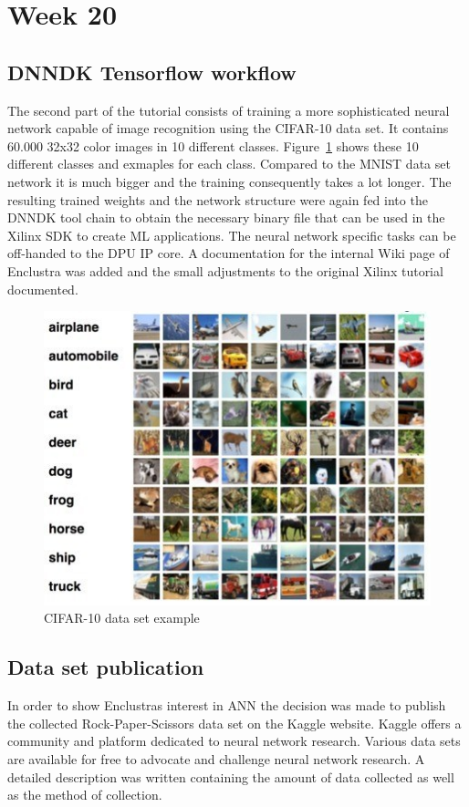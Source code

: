 \section{Week 20}
\subsection{\acs{DNNDK} Tensorflow workflow}
The second part of the tutorial consists of training a more sophisticated neural network capable of image recognition using the \ac{CIFAR}-10 data set. It contains 60.000 32x32 color images in 10 different classes. Figure~\ref{fig:cifar} shows these 10 different classes and exmaples for each class. Compared to the \ac{MNIST} data set network it is much bigger and the training consequently takes a lot longer. The resulting trained weights and the network structure were again fed into the \ac{DNNDK} tool chain to obtain the necessary binary file that can be used in the Xilinx \ac{SDK} to create \ac{ML} applications. The neural network specific tasks can be off-handed to the \ac{DPU} \ac{IP} core. A documentation for the internal Wiki page of Enclustra was added and the small adjustments to the original Xilinx tutorial documented.
\begin{figure}[!htb]
	\centering
		\includegraphics[width=\textwidth]{bilder/cifar.jpg}
		\caption{\acs{CIFAR}-10 data set example}
		\label{fig:cifar}
\end{figure}
\subsection{Data set publication}
In order to show Enclustras interest in \ac{ANN} the decision was made to publish the collected Rock-Paper-Scissors data set on the Kaggle website. Kaggle offers a community and platform dedicated to neural network research. Various data sets are available for free to advocate and challenge neural network research. A detailed description was written containing the amount of data collected as well as the method of collection.
